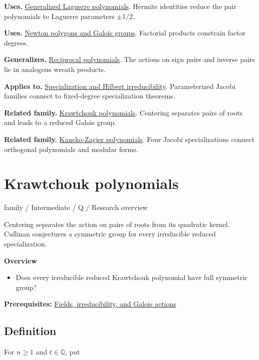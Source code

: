 \documentclass[11pt,a4paper,oneside,openany]{book}
\begin{document}
\color{black}\textbf{Uses.} \hyperlink{article:laguerre}{Generalized Laguerre polynomials}. Hermite identities reduce the pair polynomials to Laguerre parameters \ensuremath{\pm}1/2.\par
\color{black}\textbf{Uses.} \hyperlink{article:newton-polygons}{Newton polygons and Galois groups}. Factorial products constrain factor degrees.\par
\color{black}\textbf{Generalizes.} \hyperlink{article:reciprocity}{Reciprocal polynomials}. The actions on sign pairs and inverse pairs lie in analogous wreath products.\par
\color{black}\textbf{Applies to.} \hyperlink{article:specialization}{Specialization and Hilbert irreducibility}. Parameterized Jacobi families connect to fixed-degree specialization theorems.\par
\color{black}\textbf{Related family.} \hyperlink{article:krawtchouk}{Krawtchouk polynomials}. Centering separates pairs of roots and leads to a reduced Galois group.\par
\color{black}\textbf{Related family.} \hyperlink{article:kaneko-zagier}{Kaneko-Zagier polynomials}. Four Jacobi specializations connect orthogonal polynomials and modular forms.\par
\endgroup
\chapter{Krawtchouk polynomials}\label{article:krawtchouk}\hypertarget{article:krawtchouk}{}\color{black}
{\sffamily\small\color{atlasgold}family / Intermediate / Q / Research overview}\par\medskip
Centering separates the action on pairs of roots from its quadratic kernel. Cullinan conjectures a symmetric group for every irreducible reduced specialization.\par\medskip
\textbf{Overview}\begin{itemize}
\item Does every irreducible reduced Krawtchouk polynomial have full symmetric group?
\end{itemize}
{\small\textbf{Prerequisites:} \hyperlink{article:foundations}{Fields, irreducibility, and Galois actions}}\par
{}\section{Definition}
\color{black} For \(n\ge1\) and \(t\in\mathbb Q\), put\par
\end{document}
